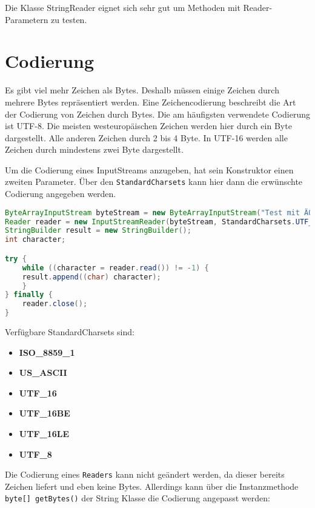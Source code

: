 Die Klasse StringReader eignet sich sehr gut um Methoden mit Reader-Parametern
zu testen.

\section{Codierung}

Es gibt viel mehr Zeichen als Bytes. Deshalb müssen einige Zeichen durch
mehrere Bytes repräsentiert werden. Eine Zeichencodierung beschreibt die Art
der Codierung von Zeichen durch Bytes. Die am häufigsten verwendete Codierung
ist UTF-8. Die meisten westeuropäischen Zeichen werden hier durch ein Byte
dargestellt. Alle anderen Zeichen durch 2 bis 4 Byte. In UTF-16 werden alle
Zeichen durch mindestens zwei Byte dargestellt.

Um die Codierung eines InputStreams anzugeben, hat sein Konstruktor einen
zweiten Parameter. Über den 
\lstinline{StandardCharsets} kann hier dann die erwünschte Codierung angegeben
werden.

\begin{lstlisting}[language=Java, caption={Beispiel für Codierten InputStream}]
ByteArrayInputStream byteStream = new ByteArrayInputStream("Test mit ÄÖÜ".getBytes(StandardCharsets.UTF_8));
Reader reader = new InputStreamReader(byteStream, StandardCharsets.UTF_8);
StringBuilder result = new StringBuilder();
int character;

try {
    while ((character = reader.read()) != -1) {
    result.append((char) character);
    }
} finally {
    reader.close();
}
\end{lstlisting}

Verfügbare StandardCharsets sind:

\begin{itemize}
    \item \textbf{ISO\_8859\_1}
    \item \textbf{US\_ASCII}
    \item \textbf{UTF\_16}
    \item \textbf{UTF\_16BE}
    \item \textbf{UTF\_16LE}
    \item \textbf{UTF\_8}
\end{itemize}

Die Codierung eines \lstinline{Readers} kann nicht geändert werden, da dieser
bereits Zeichen liefert und eben keine Bytes. Allerdings kann über die
Instanzmethode \lstinline{byte[] getBytes()} der String Klasse die Codierung
angepasst werden:

